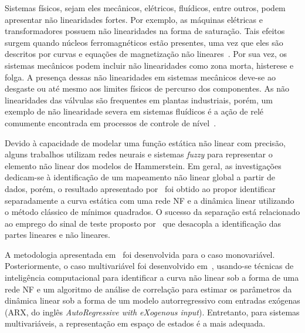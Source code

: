 %
\par
Sistemas físicos, sejam eles mecânicos, elétricos, fluídicos, entre outros, podem apresentar não linearidades fortes. Por exemplo, as máquinas elétricas e transformadores possuem não linearidades na forma de saturação. Tais efeitos surgem quando núcleos ferromagnéticos estão presentes, uma vez que eles são descritos por curvas e equações de magnetização não lineares~\citep{fitzgerald2003}. Por sua vez, os sistemas mecânicos podem incluir não linearidades como zona morta, histerese e folga. A presença dessas não linearidades em sistemas mecânicos deve-se ao desgaste ou até mesmo aos limites físicos de percurso dos componentes. As não linearidades das válvulas são frequentes em plantas industriais, porém, um exemplo de não linearidade severa em sistemas fluídicos é a ação de relé comumente encontrada em processos de controle de nível~\citep{garcia2013}. 
\par
Devido à capacidade de modelar uma função estática não linear com precisão, alguns trabalhos utilizam redes neurais e sistemas \textit{fuzzy} para representar o elemento não linear dos modelos de Hammerstein. Em geral, as investigações dedicam-se à identificação de um mapeamento não linear global a partir de dados, porém, o resultado apresentado por~\cite{jia2005} foi obtido ao propor identificar separadamente a curva estática com uma rede \acs{NF} e a dinâmica linear utilizando o método clássico de mínimos quadrados. O sucesso da separação está relacionado ao emprego do sinal de teste proposto por~\cite{sung2002} que desacopla a identificação das partes lineares e não lineares. 
\par
A metodologia apresentada em~\citep{jia2005} foi desenvolvida para o caso monovariável. Posteriormente, o caso multivariável foi desenvolvido em~\citep{jia2016}, usando-se técnicas de inteligência computacional para identificar a curva não linear sob a forma de uma rede \acs{NF} e um algoritmo de análise de correlação para estimar os parâmetros da dinâmica linear sob a forma de um modelo  autorregressivo com entradas exógenas (\acs{ARX}, do inglês \textit{AutoRegressive with eXogenous input}). Entretanto, para sistemas multivariáveis, a representação em espaço de estados é a mais adequada. 
\par 
